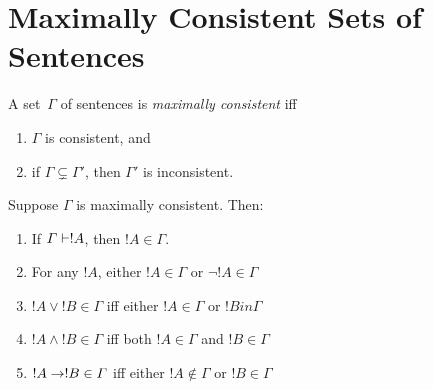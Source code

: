 \documentclass[open-logic-section]{subfiles}
\begin{document}
\section{Maximally Consistent Sets of Sentences}

\begin{defn}
A set~$\Gamma$ of sentences is \emph{maximally consistent} iff
\begin{enumerate}
\item $\Gamma$ is consistent, and
\item if $\Gamma \subsetneq \Gamma'$, then $\Gamma'$ is inconsistent.
\end{enumerate}
\end{defn}

\begin{prop}
Suppose $\Gamma$ is maximally consistent. Then:
\begin{enumerate}
\item If $\Gamma \Proves !A$, then $!A \in \Gamma$.
\item For any $!A$, either $!A \in \Gamma$ or $\lnot !A \in \Gamma$
\item $!A \lor !B \in \Gamma$ iff either $!A \in \Gamma$ or $!B in \Gamma$
\item $!A \land !B \in \Gamma$ iff both $!A \in \Gamma$ and $!B \in \Gamma$
\item $!A \to !B \in \Gamma$ iff either $!A \notin \Gamma$ or $!B \in \Gamma$
\end{enumerate}
\end{prop}

\end{document}
